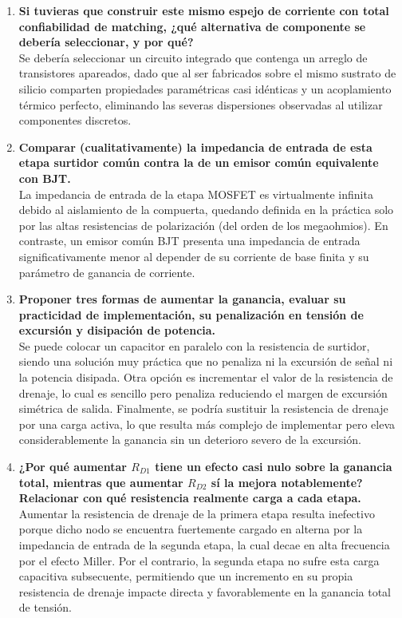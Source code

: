 \begin{enumerate}
\item \textbf{Si tuvieras que construir este mismo espejo de corriente con total confiabilidad de matching, ¿qué alternativa de componente se debería seleccionar, y por qué?} \\
Se debería seleccionar un circuito integrado que contenga un arreglo de transistores apareados, dado que al ser fabricados sobre el mismo sustrato de silicio comparten propiedades paramétricas casi idénticas y un acoplamiento térmico perfecto, eliminando las severas dispersiones observadas al utilizar componentes discretos.

\item \textbf{Comparar (cualitativamente) la impedancia de entrada de esta etapa surtidor común contra la de un emisor común equivalente con BJT.} \\
La impedancia de entrada de la etapa MOSFET es virtualmente infinita debido al aislamiento de la compuerta, quedando definida en la práctica solo por las altas resistencias de polarización (del orden de los megaohmios). En contraste, un emisor común BJT presenta una impedancia de entrada significativamente menor al depender de su corriente de base finita y su parámetro de ganancia de corriente.

\item \textbf{Proponer tres formas de aumentar la ganancia, evaluar su practicidad de implementación, su penalización en tensión de excursión y disipación de potencia.} \\
Se puede colocar un capacitor en paralelo con la resistencia de surtidor, siendo una solución muy práctica que no penaliza ni la excursión de señal ni la potencia disipada. Otra opción es incrementar el valor de la resistencia de drenaje, lo cual es sencillo pero penaliza reduciendo el margen de excursión simétrica de salida. Finalmente, se podría sustituir la resistencia de drenaje por una carga activa, lo que resulta más complejo de implementar pero eleva considerablemente la ganancia sin un deterioro severo de la excursión.

\item \textbf{¿Por qué aumentar $R_{D1}$ tiene un efecto casi nulo sobre la ganancia total, mientras que aumentar $R_{D2}$ sí la mejora notablemente? Relacionar con qué resistencia realmente carga a cada etapa.} \\
Aumentar la resistencia de drenaje de la primera etapa resulta inefectivo porque dicho nodo se encuentra fuertemente cargado en alterna por la impedancia de entrada de la segunda etapa, la cual decae en alta frecuencia por el efecto Miller. Por el contrario, la segunda etapa no sufre esta carga capacitiva subsecuente, permitiendo que un incremento en su propia resistencia de drenaje impacte directa y favorablemente en la ganancia total de tensión.


\end{enumerate}
